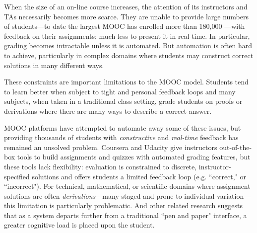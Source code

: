 \documentclass{sigchi}
\begin{document}


When the size of an on-line course increases, the attention of its instructors and TAs necessarily becomes more scarce. They are unable to provide large numbers of students---to date the largest MOOC has enrolled more than 180,000 \cite{enroll}---with feedback on their assignments; much less to present it in real-time. In particular, grading becomes intractable unless it is automated. But automation is often hard to achieve, particularly in complex domains where students may construct correct solutions in many different ways. \cite{automated-scoring-design, automated-grading}

These constraints are important limitations to the MOOC model. Students tend to learn better when subject to tight and personal feedback loops \cite{personalized-feedback} and many subjects, when taken in a traditional class setting, grade students on proofs or derivations where there are many ways to describe a correct answer.

MOOC platforms have attempted to automate away some of these issues, but providing thousands of students with \textit{constructive} and \textit{real-time} feedback has remained an unsolved problem. \cite{derivation-scoring} Coursera and Udacity give instructors out-of-the-box tools to build assignments and quizzes with automated grading features, but these tools lack flexibility: evaluation is constrained to discrete, instructor-specified solutions and offers students a limited feedback loop (e.g. ``correct," or ``incorrect"). \cite{fixme} For technical, mathematical, or scientific domains where assignment solutions are often \textit{derivations}---many-staged and prone to individual variation---this limitation is particularly problematic. \cite{derivation-scoring} And other related research suggests that as a system departs further from a traditional ``pen and paper" interface, a greater cognitive load is placed upon the student. \cite{interface-learning-load}
\end{document}
